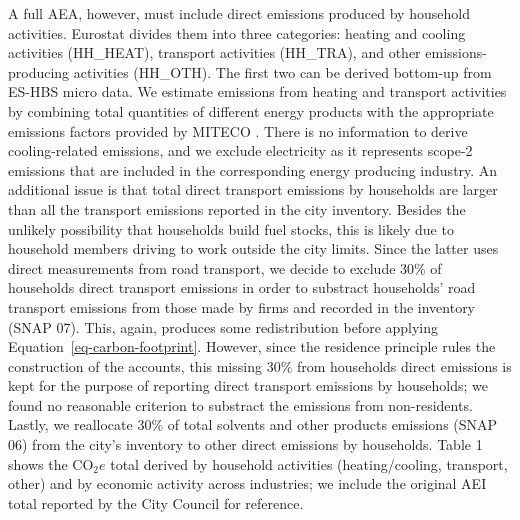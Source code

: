 \documentclass[
  10pt,
  twocolumn]{aft}
\begin{document}
A full AEA, however, must include direct emissions produced by household
activities. Eurostat divides them into three categories: heating and
cooling activities (HH\_HEAT), transport activities (HH\_TRA), and other
emissions-producing activities (HH\_OTH). The first two can be derived
bottom-up from ES-HBS micro data. We estimate emissions from heating and
transport activities by combining total quantities of different energy
products with the appropriate emissions factors provided by MITECO
\citeyearpar{miteco_calculadora_2023}. There is no information to derive
cooling-related emissions, and we exclude electricity as it represents
scope-2 emissions that are included in the corresponding energy
producing industry. An additional issue is that total direct transport
emissions by households are larger than all the transport emissions
reported in the city inventory. Besides the unlikely possibility that
households build fuel stocks, this is likely due to household members
driving to work outside the city limits. Since the latter uses direct
measurements from road transport, we decide to exclude 30\% of
households direct transport emissions in order to substract households'
road transport emissions from those made by firms and recorded in the
inventory (SNAP 07). This, again, produces some redistribution before
applying Equation~\ref{eq-carbon-footprint}. However, since the
residence principle rules the construction of the accounts, this missing
30\% from households direct emissions is kept for the purpose of
reporting direct transport emissions by households; we found no
reasonable criterion to substract the emissions from non-residents.
Lastly, we reallocate 30\% of total solvents and other products
emissions (SNAP 06) from the city's inventory to other direct emissions
by households. Table 1 shows the \(\text{CO}_2e\) total derived by
household activities (heating/cooling, transport, other) and by economic
activity across industries; we include the original AEI total reported
by the City Council for reference.
\end{document}
